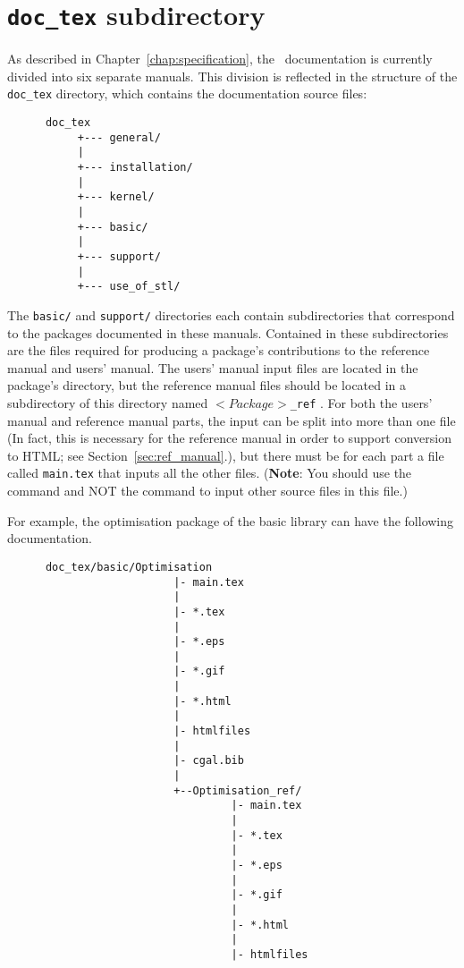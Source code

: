 \section{{\tt doc\_tex} subdirectory}
\label{sec:doc_tex_subdirectory}

As described in Chapter~\ref{chap:specification}, the \cgal\ documentation is
currently divided into six separate manuals.  This division is reflected
in the structure of the {\tt doc\_tex} directory, which contains the 
documentation source files: 
\begin{verbatim}
      doc_tex
           +--- general/
           |
           +--- installation/
           |
           +--- kernel/
           |
           +--- basic/
           |
           +--- support/
           |
           +--- use_of_stl/
\end{verbatim}

The {\tt basic/} and {\tt support/} directories each contain subdirectories
that correspond to the packages documented in these manuals.  Contained in these
subdirectories are the files required for producing a package's contributions
to the reference manual and users' manual. The users' manual input files are
located in the package's directory, but the reference manual files should
be located in a subdirectory of this directory named $<Package>${\tt \_ref}
.  
For both the users' manual and reference manual parts, the input can be
split into more than one file (In fact, this is necessary for the reference
manual in order to support conversion to HTML; 
see Section~\ref{sec:ref_manual}.), but
there must be for each part a file called {\tt main.tex} that inputs all
the other files.
({\bf Note}: You should use the \verb|| command and NOT the 
\verb|| command to input other source files in this file.)  

For example, the optimisation package of 
the basic library can have the following documentation. 
\begin{verbatim}
      doc_tex/basic/Optimisation
                          |- main.tex
                          |
                          |- *.tex
                          |
                          |- *.eps
                          |
                          |- *.gif
                          |
                          |- *.html
                          |
                          |- htmlfiles
                          |
                          |- cgal.bib
                          |
                          +--Optimisation_ref/
                                   |- main.tex
                                   |
                                   |- *.tex
                                   |
                                   |- *.eps
                                   |
                                   |- *.gif
                                   |
                                   |- *.html
                                   |
                                   |- htmlfiles
\end{verbatim}

